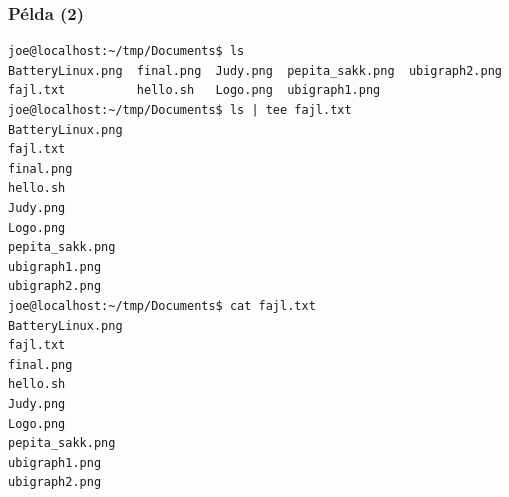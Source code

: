\subsubsection*{Példa (2)}

\begin{lstlisting}
joe@localhost:~/tmp/Documents$ ls
BatteryLinux.png  final.png  Judy.png  pepita_sakk.png  ubigraph2.png
fajl.txt          hello.sh   Logo.png  ubigraph1.png
joe@localhost:~/tmp/Documents$ ls | tee fajl.txt
BatteryLinux.png
fajl.txt
final.png
hello.sh
Judy.png
Logo.png
pepita_sakk.png
ubigraph1.png
ubigraph2.png
joe@localhost:~/tmp/Documents$ cat fajl.txt 
BatteryLinux.png
fajl.txt
final.png
hello.sh
Judy.png
Logo.png
pepita_sakk.png
ubigraph1.png
ubigraph2.png
\end{lstlisting}





